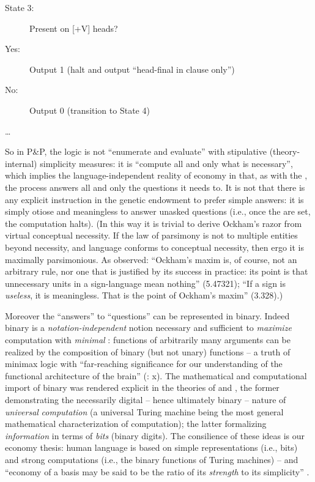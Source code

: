 \documentclass[output=paper]{langsci/langscibook}
\begin{document}
 \begin{description}
\item[State 3:] Present on [+V] heads?
\item[Yes:] Output 1 (halt and output “head-final in clause only”)
\item[No:] Output 0 (transition to State 4)
 \end{description}
    
     \dots{}
\z

So in P\&P, the logic is not “enumerate and evaluate” with stipulative
(theory-internal) simplicity measures: it is “compute all and only what is
necessary”, which implies the language-independent reality of economy in that,
as with the , the process answers all and only the
questions it needs to. It is not that there is any explicit instruction in the
genetic endowment to prefer simple answers: it is simply otiose and meaningless
to answer unasked questions (i.e., once the  are set, the computation
halts). (In this way it is trivial to derive Ockham’s razor from virtual
conceptual necessity. If the law of parsimony is not to multiple entities
beyond necessity, and language conforms to conceptual necessity, then ergo it
is maximally parsimonious. As \citet{Wittgenstein1922} observed: “Ockham’s
maxim is, of course, not an arbitrary rule, nor one that is justified by its
success in practice: its point is that unnecessary units in a sign-language
mean nothing” (5.47321); “If a sign is \emph{useless}, it is meaningless. That
is the point of Ockham’s maxim” (3.328).)

Moreover the “answers” to “questions” can be represented in binary. Indeed
binary is a \emph{notation-independent} notion necessary and sufficient to
\emph{maximize} computation with \emph{minimal} : functions of
arbitrarily many arguments can be realized by the composition of binary (but
not unary) functions – a truth of minimax logic with “far-reaching significance
for our understanding of the functional architecture of the brain”
(\citealt{GallistelKing2010}: x). The mathematical and computational
import of binary was rendered explicit in the theories of \citet{Turing1936}
and \citet{Shannon1948}, the former demonstrating the necessarily digital –
hence ultimately binary – nature of \emph{universal} \emph{computation} (a
universal Turing machine being the most general mathematical characterization
of computation); the latter formalizing \emph{information} in terms of
\emph{bits} (binary digits). The consilience of these ideas is our economy
thesis: human language is based on simple representations (i.e., bits) and
strong computations (i.e., the binary functions of Turing machines) – and
“economy of a basis may be said to be the ratio of its \emph{strength} to its
simplicity” \citep[111]{Goodman1943}.
\end{document}
